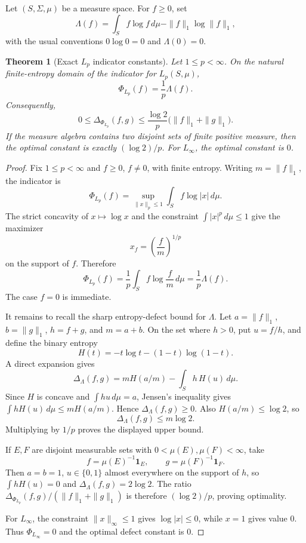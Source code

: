 \documentclass[11pt]{article}
\newtheorem{theorem}{Theorem}
\newcommand{\1}{\mathbf 1}
\begin{document}
Let \((S,\Sigma,\mu)\) be a measure space. For \(f\geq0\), set
\[
  \Lambda(f)
  = \int_S f\log f\,d\mu-\|f\|_1\log\|f\|_1,
\]
with the usual conventions \(0\log0=0\) and \(\Lambda(0)=0\).

\begin{theorem}[Exact \(L_p\) indicator constants]
\label{thm:lp}
Let \(1\leq p<\infty\). On the natural finite-entropy domain of the
indicator for \(L_p(S,\mu)\),
\[
  \Phi_{L_p}(f)=\frac1p\Lambda(f).
\]
Consequently,
\[
  0\leq \Delta_{\Phi_{L_p}}(f,g)
  \leq \frac{\log 2}{p}\bigl(\|f\|_1+\|g\|_1\bigr).
\]
If the measure algebra contains two disjoint sets of finite positive measure,
then the optimal constant is exactly \((\log 2)/p\). For \(L_\infty\), the
optimal constant is \(0\).
\end{theorem}

\begin{proof}
Fix \(1\leq p<\infty\) and \(f\geq0\), \(f\neq0\), with finite entropy.
Writing \(m=\|f\|_1\), the indicator is
\[
  \Phi_{L_p}(f)=
  \sup_{\|x\|_p\leq1}\int_S f\log|x|\,d\mu.
\]
The strict concavity of \(x\mapsto \log x\) and the constraint
\(\int |x|^p\,d\mu\leq1\) give the maximizer
\[
  x_f=\left(\frac{f}{m}\right)^{1/p}
\]
on the support of \(f\). Therefore
\[
  \Phi_{L_p}(f)
  =\frac1p\int_S f\log\frac{f}{m}\,d\mu
  =\frac1p\Lambda(f).
\]
The case \(f=0\) is immediate.

It remains to recall the sharp entropy-defect bound for \(\Lambda\). Let
\(a=\|f\|_1\), \(b=\|g\|_1\), \(h=f+g\), and \(m=a+b\). On the set where
\(h>0\), put \(u=f/h\), and define the binary entropy
\[
  H(t)=-t\log t-(1-t)\log(1-t).
\]
A direct expansion gives
\[
  \Delta_{\Lambda}(f,g)
  = m H(a/m)-\int_S h\,H(u)\,d\mu .
\]
Since \(H\) is concave and \(\int h u\,d\mu=a\), Jensen's inequality gives
\(\int hH(u)\,d\mu\leq mH(a/m)\). Hence \(\Delta_\Lambda(f,g)\geq0\).
Also \(H(a/m)\leq \log 2\), so
\[
  \Delta_{\Lambda}(f,g)\leq m\log2.
\]
Multiplying by \(1/p\) proves the displayed upper bound.

If \(E,F\) are disjoint measurable sets with \(0<\mu(E),\mu(F)<\infty\), take
\[
  f=\mu(E)^{-1}\1_E,\qquad g=\mu(F)^{-1}\1_F.
\]
Then \(a=b=1\), \(u\in\{0,1\}\) almost everywhere on the support of \(h\), so
\(\int hH(u)=0\) and \(\Delta_\Lambda(f,g)=2\log2\). The ratio
\(\Delta_{\Phi_{L_p}}(f,g)/(\|f\|_1+\|g\|_1)\) is therefore
\((\log2)/p\), proving optimality.

For \(L_\infty\), the constraint \(\|x\|_\infty\leq1\) gives
\(\log |x|\leq0\), while \(x=1\) gives value \(0\). Thus
\(\Phi_{L_\infty}=0\) and the optimal defect constant is \(0\).
\end{proof}
\end{document}
